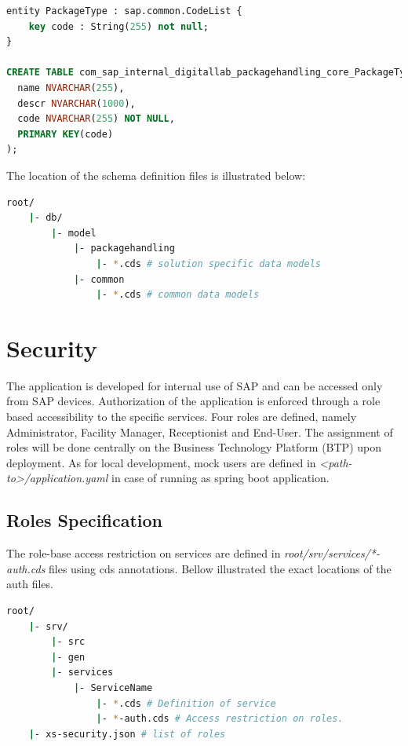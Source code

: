\begin{lstlisting}[language={sql}]
entity PackageType : sap.common.CodeList {
    key code : String(255) not null;
}

CREATE TABLE com_sap_internal_digitallab_packagehandling_core_PackageType (
  name NVARCHAR(255),
  descr NVARCHAR(1000),
  code NVARCHAR(255) NOT NULL,
  PRIMARY KEY(code)
);
\end{lstlisting}

The location of the schema definition files is illustrated below:
\begin{lstlisting}[language={bash}]
root/
    |- db/
        |- model
            |- packagehandling 
                |- *.cds # solution specific data models
            |- common
                |- *.cds # common data models
\end{lstlisting}


\section{Security}
\label{sec:D-security}

The application is developed for internal use of SAP and can be accessed only from SAP devices. 
Authorization of the application is enforced through a role based accessibility to the specific services. Four roles are defined, namely Administrator, Facility Manager, Receptionist and End-User. The assignment of roles will be done centrally on the Business Technology Platform (BTP) upon deployment. As for local development, mock users are defined in \textit{<path-to>/application.yaml} in case of running as spring boot \cite{springboot-doc} application.

\subsection{Roles Specification}
The role-base access restriction on services are defined in \textit{root/srv/services/*-auth.cds} files using cds annotations. Bellow illustrated the exact locations of the auth files.

\begin{lstlisting}[language={bash}]
root/
    |- srv/
        |- src
        |- gen
        |- services
            |- ServiceName 
                |- *.cds # Definition of service
                |- *-auth.cds # Access restriction on roles.
    |- xs-security.json # list of roles
\end{lstlisting}

